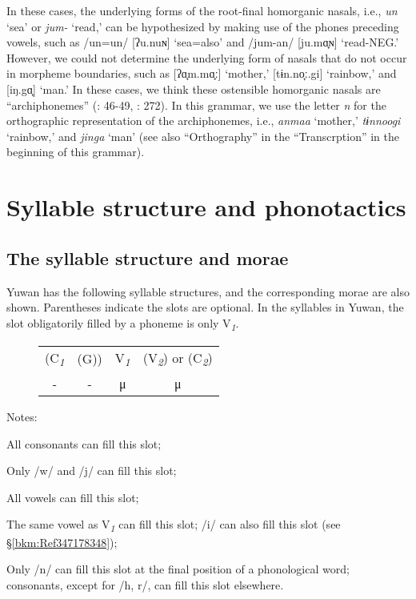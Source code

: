 In these cases, the underlying forms of the root-final homorganic nasals, i.e., \textit{un} ‘sea’ or \textit{jum-} ‘read,’ can be hypothesized by making use of the phones preceding vowels, such as /un=un/ [ʔu.nuɴ] ‘sea=also’ and /jum-an/ [ju.mɑ̟ɴ] ‘read-NEG.’ However, we could not determine the underlying form of nasals that do not occur in morpheme boundaries, such as [ʔɑ̟m.mɑ̟ː] ‘mother,’ [tɨn.no̞ː.gi] ‘rainbow,’ and [iŋ.gɑ̟] ‘man.’ In these cases, we think these ostensible homorganic nasals are “archiphonemes” (\citealt{Lass1984}: 46-49, \citealt{Dixon2010}: 272). In this grammar, we use the letter \textit{n} for the orthographic representation of the archiphonemes, i.e., \textit{anmaa} ‘mother,’ \textit{tɨnnoogi} ‘rainbow,’ and \textit{jinga} ‘man’ (see also “Orthography” in the “Transcrption” in the beginning of this grammar).

\section{Syllable structure and phonotactics}
\label{bkm:Ref302599307}\hypertarget{RefHeadingToc395696969}{}\subsection{The syllable structure and morae}
\label{bkm:Ref301830963}\hypertarget{RefHeadingToc395696970}{}\label{bkm:Ref381399409}
Yuwan has the following syllable structures, and the corresponding morae are also shown. Parentheses indicate the slots are optional. In the syllables in Yuwan, the slot obligatorily filled by a phoneme is only V\textit{\textsubscript{1}}.

\begin{figure}
\caption{}
\begin{tabular}{cccc}
 (C\textit{\textsubscript{1}} & (G)) & V\textit{\textsubscript{1}} & (V\textit{\textsubscript{2}})  or  (C\textit{\textsubscript{2}})\\
 {}- & {}- & μ  & μ\\
\end{tabular}
\end{figure}

Notes: 
\begin{description}[font=\normalfont]
\item[C\textit{\textsubscript{1}}:] All consonants can fill this slot;
\item[G:] Only /w/ and /j/ can fill this slot;
\item[V\textit{\textsubscript{1}}:] All vowels can fill this slot;
\item[V\textit{\textsubscript{2}}:] The same vowel as V\textit{\textsubscript{1}} can fill this slot; /i/ can also fill this slot (see §\ref{bkm:Ref347178348});
\item[C\textit{\textsubscript{2}}:] Only /n/ can fill this slot at the final position of a phonological word; consonants, except for /h, r/, can fill this slot elsewhere.
\end{description}



